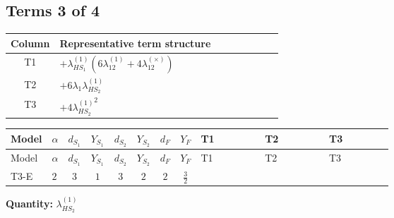 \documentclass[8pt]{article}
\begin{document}
\begin{landscape}
\subsection*{Terms 3 of 4}
\begin{center}
\begin{tabular}{@{}c >{\raggedright\arraybackslash}p{0.82\linewidth}@{}}
\toprule
Column & Representative term structure \\
\midrule
T1 & \(\displaystyle +{\lambda_{HS_1}^{(1)}} (6 {\lambda_{12}^{(1)}}+4 {\lambda_{12}^{(\times)}})\) \\
\midrule
T2 & \(\displaystyle +6 {\lambda_1} {\lambda_{HS_2}^{(1)}}\) \\
\midrule
T3 & \(\displaystyle +4 {\lambda_{HS_2}^{(1)}}^2\) \\
\midrule
\bottomrule
\end{tabular}
\end{center}
\smallskip
\tiny
\begin{longtable}{@{}llcccccc >{\raggedright\arraybackslash}p{0.21\linewidth} >{\raggedright\arraybackslash}p{0.21\linewidth} >{\raggedright\arraybackslash}p{0.21\linewidth}@{}}
\toprule
Model & $\alpha$ & $d_{S_1}$ & $Y_{S_1}$ & $d_{S_2}$ & $Y_{S_2}$ & $d_F$ & $Y_F$ & T1 & T2 & T3 \\
\midrule
\endfirsthead
\toprule
Model & $\alpha$ & $d_{S_1}$ & $Y_{S_1}$ & $d_{S_2}$ & $Y_{S_2}$ & $d_F$ & $Y_F$ & T1 & T2 & T3 \\
\midrule
\endhead
T3-E & $2$ & $3$ & $1$ & $3$ & $2$ & $2$ & $\frac{3}{2}$ & \scriptsize\adjustbox{max width=\linewidth}{$\begin{gathered} +{\lambda_{HS_1}^{(1)}} (6 {\lambda_{12}^{(1)}}+4 {\lambda_{12}^{(\times)}})\end{gathered}$} & \scriptsize\adjustbox{max width=\linewidth}{$\begin{gathered} +6 {\lambda_1} {\lambda_{HS_2}^{(1)}}\end{gathered}$} & \scriptsize\adjustbox{max width=\linewidth}{$\begin{gathered} +4 {\lambda_{HS_2}^{(1)}}^2\end{gathered}$} \\
\midrule
\bottomrule
\end{longtable}
\clearpage
\noindent\textbf{Quantity: }$\lambda_{HS_2}^{(1)}$\par\smallskip

\end{landscape}
\end{document}
